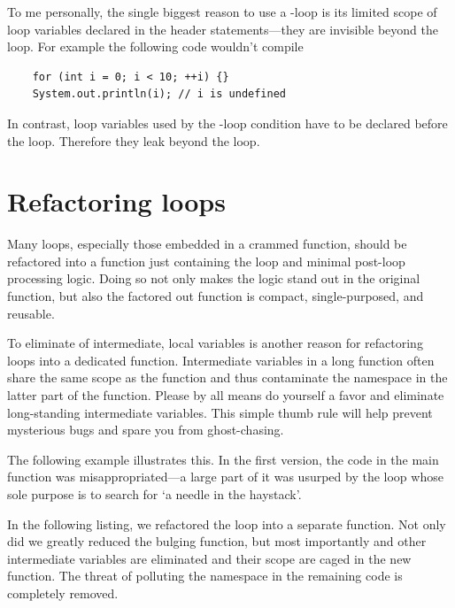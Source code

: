 To me personally, the single biggest reason to use a -loop is its limited scope of
loop variables declared in the  header statements---they are invisible beyond the loop.
For example the following code wouldn't compile
\begin{lstlisting}
    for (int i = 0; i < 10; ++i) {}
    System.out.println(i); // i is undefined
\end{lstlisting}
In contrast, loop variables used by the -loop condition have to be declared
before the loop.
Therefore they leak beyond the loop.




\section{Refactoring loops}\label{sec:refactoringLoops}

Many loops, especially those embedded in a crammed function, should be
refactored into a function just containing the loop and minimal post-loop processing logic.
Doing so not only makes the logic stand out in the original function,
but also the factored out function is compact, single-purposed, and reusable.

To eliminate of intermediate, local variables is another reason for refactoring loops into a
dedicated function.
Intermediate variables in a long function often share the same scope as the function
and thus contaminate the namespace in the latter part of the function.
Please by all means do yourself a favor and eliminate long-standing intermediate variables.
This simple thumb rule will help prevent mysterious bugs and spare you from ghost-chasing.


The following example illustrates this.
In the first version, the code in the main function  was
misappropriated---a large part of it was usurped by the loop whose sole purpose
is to search for `a needle in the haystack'.

In the following listing, we refactored the loop into a separate function.
Not only did we greatly reduced the bulging function, but most importantly
 and other intermediate variables are eliminated and
their scope are caged in the new function.
The threat of polluting the namespace in the remaining code is completely removed.




